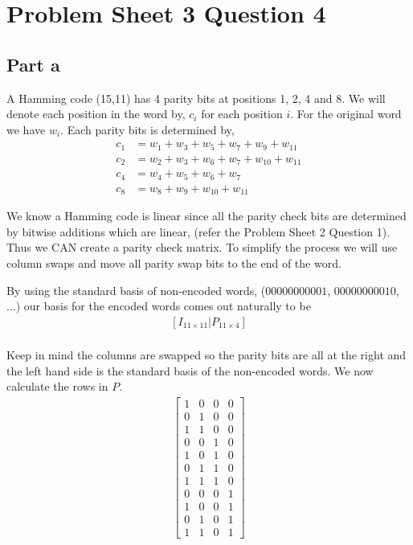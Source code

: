\documentclass{article}
\begin{document}
\section{Problem Sheet 3 Question 4}
\subsection{Part a}
A Hamming code (15,11) has 4 parity bits at positions 1, 2, 4 and 8. We will
denote each position in the word by, $c_i$ for each position $i$. For the
original word we have $w_i$.
Each parity bits is determined by,
\begin{align*}
    c_1 &= w_1 + w_3 + w_5 + w_7 + w_9 + w_{11} \\
    c_2 &= w_2 + w_3 + w_6 + w_7 + w_{10} + w_{11} \\
    c_4 &= w_4 + w_5 + w_6 + w_7 \\
    c_8 &= w_8 + w_9 + w_{10} + w_{11}
\end{align*}

We know a Hamming code is linear since all the parity check bits are determined
by bitwise additions which are linear, (refer the Problem Sheet 2 Question 1).
Thus we CAN create a parity check matrix. To simplify the process we will
use column swaps and move all parity swap bits to the end of the word.

By using the standard basis of non-encoded words, ($00000000001$,
$00000000010$, ...) our basis for the encoded words comes out naturally to be
\begin{align*}
    \left[ I_{11\times11} | P_{11\times4} \right] \\
\end{align*}

Keep in mind the columns are swapped so the parity bits are all at the right
and the left hand side is the standard basis of the non-encoded words. We now
calculate the rows in $P$.
\begin{align*}
    \begin{bmatrix}
        1 & 0 & 0 & 0 \\
        0 & 1 & 0 & 0 \\
        1 & 1 & 0 & 0 \\
        0 & 0 & 1 & 0 \\
        1 & 0 & 1 & 0 \\
        0 & 1 & 1 & 0 \\
        1 & 1 & 1 & 0 \\
        0 & 0 & 0 & 1 \\
        1 & 0 & 0 & 1 \\
        0 & 1 & 0 & 1 \\
        1 & 1 & 0 & 1
    \end{bmatrix}
\end{align*}
\end{document}
